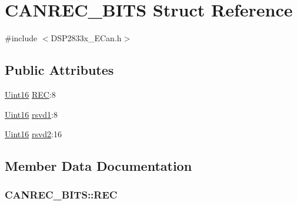 \hypertarget{struct_c_a_n_r_e_c___b_i_t_s}{}\section{C\+A\+N\+R\+E\+C\+\_\+\+B\+I\+T\+S Struct Reference}
\label{struct_c_a_n_r_e_c___b_i_t_s}


{\ttfamily \#include $<$D\+S\+P2833x\+\_\+\+E\+Can.\+h$>$}

\subsection*{Public Attributes}
\begin{DoxyCompactItemize}
\item 
\hyperlink{_d_s_p2833x___device_8h_a59a9f6be4562c327cbfb4f7e8e18f08b}{Uint16} \hyperlink{struct_c_a_n_r_e_c___b_i_t_s_aa033a6b74b19c4b333c2e332d9b8dba7}{R\+E\+C}\+:8
\item 
\hyperlink{_d_s_p2833x___device_8h_a59a9f6be4562c327cbfb4f7e8e18f08b}{Uint16} \hyperlink{struct_c_a_n_r_e_c___b_i_t_s_af00676144a2449b6922a0beb1f5816d0}{rsvd1}\+:8
\item 
\hyperlink{_d_s_p2833x___device_8h_a59a9f6be4562c327cbfb4f7e8e18f08b}{Uint16} \hyperlink{struct_c_a_n_r_e_c___b_i_t_s_af2d46b927519f1fe451008da6ff215c1}{rsvd2}\+:16
\end{DoxyCompactItemize}


\subsection{Member Data Documentation}
\hypertarget{struct_c_a_n_r_e_c___b_i_t_s_aa033a6b74b19c4b333c2e332d9b8dba7}{}
\subsubsection[{R\+E\+C}]{ C\+A\+N\+R\+E\+C\+\_\+\+B\+I\+T\+S\+::\+R\+E\+C}\label{struct_c_a_n_r_e_c___b_i_t_s_aa033a6b74b19c4b333c2e332d9b8dba7}
\hypertarget{struct_c_a_n_r_e_c___b_i_t_s_af00676144a2449b6922a0beb1f5816d0}{}
